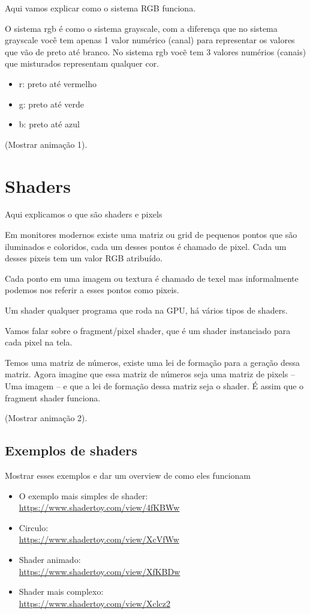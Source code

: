 \documentclass{article}
\begin{document}
Aqui vamos explicar como o sistema RGB funciona.

O sistema rgb é como o sistema grayscale, com a diferença que no sistema grayscale você tem apenas 1 valor numérico (canal) para representar os valores que vão de 
preto até branco. No sistema rgb vocẽ tem 3 valores numérios (canais) que misturados representam qualquer cor.

\begin{itemize}
    \item r: preto até vermelho 
    \item g: preto até verde 
    \item b: preto até azul 
\end{itemize}

(Mostrar animação 1).

\section*{Shaders}

Aqui explicamos o que são shaders e pixels

Em monitores modernos existe uma matriz ou grid de pequenos pontos que são iluminados e coloridos, cada um desses pontos é chamado de pixel. Cada um desses pixeis tem um valor
RGB atribuído.

Cada ponto em uma imagem ou textura é chamado de texel mas informalmente podemos nos referir a esses pontos como pixeis.

Um shader qualquer programa que roda na GPU, há vários tipos de shaders.

Vamos falar sobre o fragment/pixel shader, que é um shader instanciado para cada pixel na tela.

Temos uma matriz de números, existe uma lei de formação para a geração dessa matriz. Agora imagine que essa matriz de números seja uma matriz de pixels -- Uma imagem -- e que
a lei de formação dessa matriz seja o shader. É assim que o fragment shader funciona.

(Mostrar animação 2).

\subsection*{Exemplos de shaders}

Mostrar esses exemplos e dar um overview de como eles funcionam

\begin{itemize}
\item O exemplo mais simples de shader:\\
 \url{https://www.shadertoy.com/view/4fKBWw}

\item Circulo:\\
 \url{https://www.shadertoy.com/view/XcVfWw}

\item Shader animado:\\
 \url{https://www.shadertoy.com/view/XfKBDw}

\item Shader mais complexo:\\
 \url{https://www.shadertoy.com/view/Xclcz2}

\end{itemize}
\end{document}
